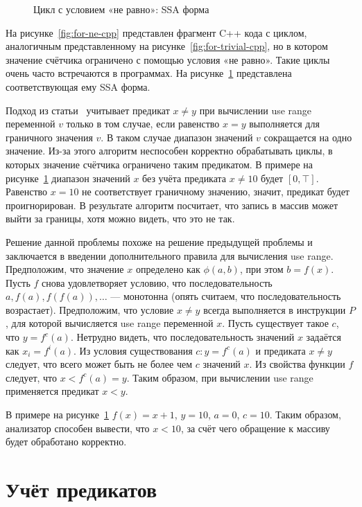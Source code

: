 \begin{figure}
    \caption{Цикл с условием «не равно»: SSA форма}
    \label{fig:for-ne-ssa}
\end{figure}

На рисунке~\ref{fig:for-ne-cpp} представлен фрагмент C++ кода с
циклом, аналогичным представленному на
рисунке~\ref{fig:for-trivial-cpp}, но в котором значение счётчика
ограничено с помощью условия «не равно». Такие циклы очень часто
встречаются в программах.  На рисунке~\ref{fig:for-ne-ssa}
представлена соответствующая ему SSA форма.

Подход из статьи~\cite{li2010practical} учитывает предикат $x \neq y$
при вычислении use range переменной $v$ только в том случае, если
равенство $x = y$ выполняется для граничного значения $v$. В таком
случае диапазон значений $v$ сокращается на одно значение. Из-за этого
алгоритм неспособен корректно обрабатывать циклы, в которых значение
счётчика ограничено таким предикатом. В примере на
рисунке~\ref{fig:for-ne-ssa} диапазон значений $x$ без учёта предиката $x \neq
10$ будет $[0, \top]$. Равенство $x = 10$ не соответствует
граничному значению, значит, предикат будет проигнорирован. В
результате алгоритм посчитает, что запись в массив может выйти за
границы, хотя можно видеть, что это не так.

Решение данной проблемы похоже на решение предыдущей проблемы и
заключается в введении дополнительного правила для вычисления use
range. Предположим, что значение $x$ определено как $\phi(a, b)$, при
этом $b = f(x)$. Пусть $f$ снова удовлетворяет условию, что
последовательность $a, f(a), f(f(a)), \dots$ --- монотонна (опять
считаем, что последовательность возрастает). Предположим, что условие
$x \neq y$ всегда выполняется в инструкции $P$, для которой
вычисляется use range переменной $x$. Пусть существует такое $c$, что
$y = f^c(a)$. Нетрудно видеть, что последовательность значений $x$
задаётся как $x_i = f^i(a)$. Из условия существования $c: y = f^c(a)$
и предиката $x \neq y$ следует, что всего может быть не более чем $c$
значений $x$. Из свойства функции $f$ следует, что $x < f^c(a) =
y$. Таким образом, при вычислении use range применяется предикат
$x < y$.

В примере на рисунке~\ref{fig:for-ne-ssa} $f(x) = x + 1$, $y = 10$,
$a = 0$, $c = 10$. Таким образом, анализатор способен вывести, что
$x < 10$, за счёт чего обращение к массиву будет обработано корректно.

\FloatBarrier

\section{Учёт предикатов}

